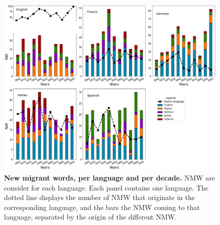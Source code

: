 \documentclass[10pt,letterpaper]{article} %
\begin{document}
\begin{figure} %
\begin{adjustwidth}{-1.2in}{0in}
\includegraphics[scale=.35]{NW_A.png}
\caption{{\bf New migrant words, per language and per decade.} 
NMW are consider for each language. Each panel contains one language. 
The dotted line displays the number of NMW that originate in the 
corresponding language, and the bars the NMW coming to that language, 
separated by the origin of the different NMW. 
% 
}
% 
\label{fig.NMW_A}
\end{adjustwidth}
\end{figure} %
	
\end{document}
